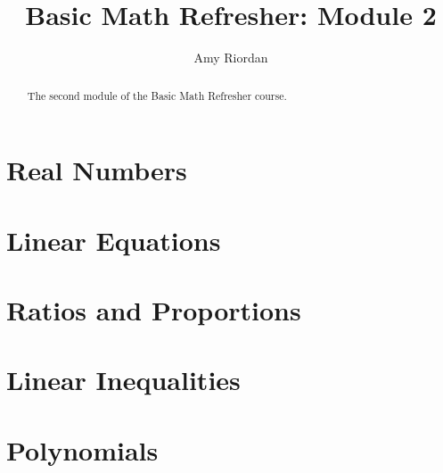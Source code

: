 \documentclass{xourse}
\title{Basic Math Refresher: Module 2}
\author{Amy Riordan}
\begin{document}
\begin{abstract}
    The second module of the Basic Math Refresher course.
\end{abstract}
\maketitle

\part{Real Numbers}


\part{Linear Equations}


\part{Ratios and Proportions}


\part{Linear Inequalities}


\part{Polynomials}

\end{document}
